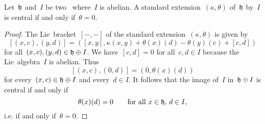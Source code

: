 \begin{proposition}
  \label{central iff theta is zero}
  Let~$\mathfrak{h}$ and~$I$ be two~\liealgebras{$\kf$} where~$I$ is abelian.
  A standard extension~$(\kappa, \theta)$ of~$\mathfrak{h}$ by~$I$ is central if and only if~$\theta = 0$.
\end{proposition}


\begin{proof}
  The Lie~bracket~$[-,-]$ of the standard extension~$(\kappa, \theta)$ is given by
  \[
    [ (x,c), (y,d) ]
    =
    ( [x,y], \kappa(x,y) + \theta(x)(d) - \theta(y)(c) + [c,d] )
  \]
  for all~$(x,c), (y,d) \in \mathfrak{h} \oplus I$.
  We have~$[c,d] = 0$ for all~$c, d \in I$ because the Lie~algebra~$I$ is abelian.
  Thus
  \[
    [ (x,c), (0,d) ]
    =
    ( 0, \theta(x)(d) )
  \]
  for every~$(x,c) \in \mathfrak{h} \oplus I$ and every~$d \in I$.
  It follows that the image of~$I$ in~$\mathfrak{h} \oplus I$ is central if and only if
  \[
    \theta(x)(d) = 0
    \qquad
    \text{for all~$x \in \mathfrak{h}$,~$d \in I$,}
  \]
  i.e. if and only if~$\theta = 0$.
\end{proof}



